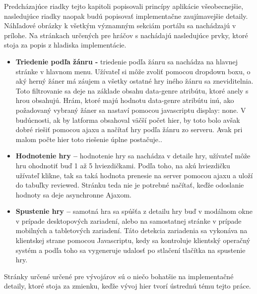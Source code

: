 Predcházajúce riadky tejto kapitoli popisovali princípy aplikácie všeobecnejšie, nasledujúce riadky naopak budú popisovať implementačne zaujímavejšie detaily. Náhľadové obrázky k všetkým významným sekciám portálu sa nachádzajú v prílohe. Na stránkach určených pre hráčov s nachádajú nasledujúce prvky, ktoré stoja za popis z hladiska implementácie.
\begin{itemize}  
\item \textbf{Triedenie podľa žánru -} triedenie podľa žánru sa nachádza na hlavnej stránke v hlavnom menu. Užívateľ si môže zvoliť pomocou dropdown boxu, o aký herný žáner má záujem a všetky ostatné hry iného žánru sa zneviditelnia. Toto filtrovanie sa deje na základe obsahu data-genre atribútu, ktoré anely s hrou obsahujú. Hrám, ktoré majú hodnotu data-genre atribútu inú, ako požadovaný vybraný žáner sa nastaví pomocou javascriptu display: none. V budúcnosti, ak by latforma obsahoval väčší počet hier,  by toto bolo avšak dobré riešiť pomocou ajaxu a načítať hry podľa žánru  zo serveru. Avak pri malom počte hier toto riešenie úplne postačuje..
\item \textbf{Hodnotenie hry –} hodnotenie hry sa nachádza v detaile hry, užívateľ môže hru ohodnotiť buď 1 až 5 hviezdičkami. Podľa toho, na akú hviezdičku užívateľ klikne, tak sa taká hodnota prenesie na server pomocou ajaxu a uloží do tabuľky reviewed. Stránku teda nie je potrebné načítať, keďže odoslanie hodnoty sa deje asynchronne Ajaxom.
\item \textbf{Spustenie hry –} samotná hra sa spúšťa z detailu hry  buď v modálnom okne v prípade desktopových zariadení, alebo na samostatnej stránke v prípade mobilných a tabletových zariadení. Táto detekcia zariadenia sa vykonáva na klientskej strane pomocou Javascriptu, kedy sa kontroluje klientský operačný systém a podľa toho sa vygeneruje udalosť po stlačení tlačítka na spustenie hry.
\end{itemize}
Stránky určené určené pre vývojárov sú o niečo bohatšie na implementačné detaily, ktoré stoja za zmienku, keďže vývoj hier tvorí ústrednú tému tejto práce. 
